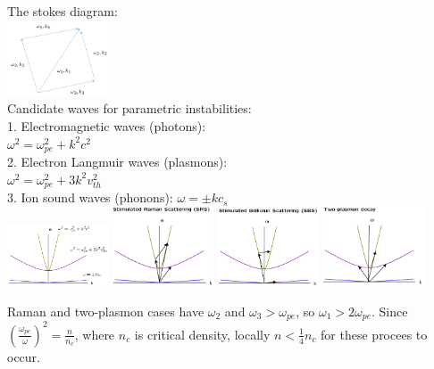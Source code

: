 \documentclass[10pt]{extarticle}
\begin{document}
\begin{multicols}{3}
The stokes diagram:\\
\includegraphics[width=3cm]{images/general_stokes.png}\\
Candidate waves for parametric instabilities:\\
1. Electromagnetic waves (photons):\\ $\omega^{2} = \omega_{pe}^{2} + k^{2}c^{2}$ \\
2. Electron Langmuir waves (plasmons): \\$\omega^{2} = \omega^{2}_{pe} + 3k^{2}v_{th}^{2}$\\
3. Ion sound waves (phonons): $\omega = \pm kc_{s}$\\
\includegraphics[width=3cm]{images/stokes_general.png}
\includegraphics[width=3cm]{images/SRS.png}
\includegraphics[width=3cm]{images/SBS.png}
\includegraphics[width=3cm]{images/Tpd.png}


Raman and two-plasmon cases have $\omega_{2}$ and $\omega_{3} > \omega_{pe}$, so $\omega_{1}>2\omega_{pe}$.  Since $(\frac{\omega_{pe}}{\omega})^{2} = \frac{n}{n_{c}}$, where $n_{c}$ is critical density, locally $n < \frac{1}{4} n_{c}$ for these procees to occur.\\
 

\end{multicols}
\end{document}
